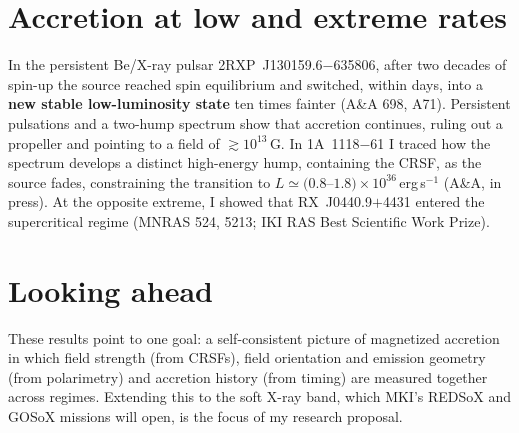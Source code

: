\documentclass[11pt]{article}
\begin{document}
\section*{Accretion at low and extreme rates}
In the persistent Be/X-ray pulsar 2RXP~J130159.6$-$635806, after two decades of spin-up
the source reached spin equilibrium and switched, within days, into a \textbf{new stable
low-luminosity state} ten times fainter (A\&A 698, A71). Persistent pulsations and a
two-hump spectrum show that accretion continues, ruling out a propeller and pointing to
a field of $\gtrsim$$10^{13}$\,G. In 1A~1118$-$61 I traced how the spectrum develops a
distinct high-energy hump, containing the CRSF, as the source fades, constraining the
transition to $L\simeq(0.8$--$1.8)\times10^{36}$\,erg\,s$^{-1}$ (A\&A, in press). At the
opposite extreme, I showed that RX~J0440.9$+$4431 entered the supercritical regime
(MNRAS 524, 5213; IKI RAS Best Scientific Work Prize).

\section*{Looking ahead}
These results point to one goal: a self-consistent picture of magnetized accretion in
which field strength (from CRSFs), field orientation and emission geometry (from
polarimetry) and accretion history (from timing) are measured together across regimes.
Extending this to the soft X-ray band, which MKI's REDSoX and GOSoX missions will open,
is the focus of my research proposal.
\end{document}
